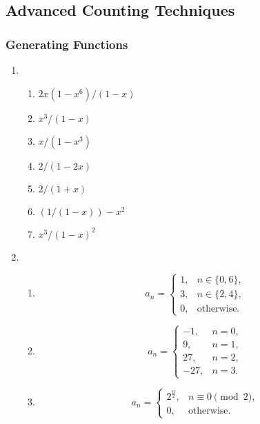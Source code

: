 \documentclass{../../cls/sig-alternate-05-2015}
\begin{document}
\subsection{Advanced Counting Techniques}
\subsubsection{Generating Functions}
\begin{enumerate}
    \item \begin{enumerate}
        \item $2x(1-x^6)/(1-x)$
        \item $x^3/(1-x)$
        \item $x/(1-x^3)$
        \item $2/(1-2x)$
        \item $2/(1+x)$
        \item $(1/(1-x))-x^2$
        \item $x^3/(1-x)^2$
    \end{enumerate}
    \item \begin{enumerate}
        \item \begin{equation}
            a_n = \begin{cases}
                1,&n \in \{0, 6\},\\
                3,&n \in \{2, 4\},\\
                0,&\text{otherwise.}
            \end{cases}
        \end{equation}
        
        \item \begin{equation}
            a_n = \begin{cases}
                -1,&n = 0,\\
                9,&n = 1,\\
                27,&n = 2,\\
                -27,&n = 3.
            \end{cases}
        \end{equation}
        
        \item \begin{equation}
            a_n = \begin{cases}
                2^{\frac{n}{2}}, & n \equiv 0 \pmod{2},\\
                0, & \text{otherwise}.
            \end{cases}
        \end{equation}
        

\end{enumerate}
\end{enumerate}
\end{document}

